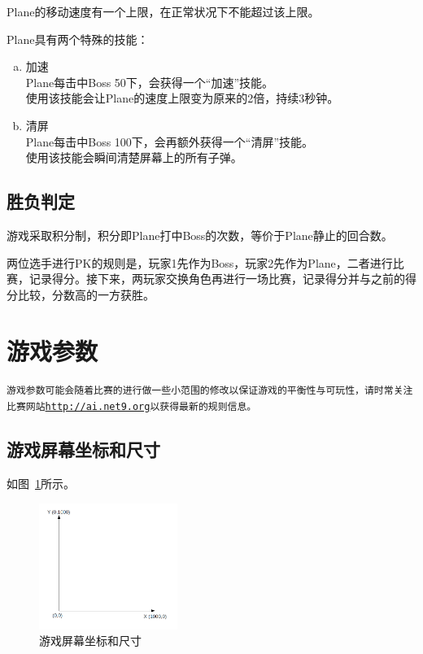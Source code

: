 \documentclass[11pt,a4paper]{article}
\begin{document}
Plane的移动速度有一个上限，在正常状况下不能超过该上限。

Plane具有两个特殊的技能：
\begin{enumerate}[(a)]
\item 加速\\
Plane每击中Boss 50下，会获得一个``加速''技能。\\
使用该技能会让Plane的速度上限变为原来的2倍，持续3秒钟。
\item 清屏\\
Plane每击中Boss 100下，会再额外获得一个``清屏''技能。\\
使用该技能会瞬间清楚屏幕上的所有子弹。
\end{enumerate}

\subsection{胜负判定}
游戏采取积分制，积分即Plane打中Boss的次数，等价于Plane静止的回合数。

两位选手进行PK的规则是，玩家1先作为Boss，玩家2先作为Plane，二者进行比赛，记录得分。接下来，两玩家交换角色再进行一场比赛，记录得分并与之前的得分比较，分数高的一方获胜。

\section{游戏参数}

\texttt{游戏参数可能会随着比赛的进行做一些小范围的修改以保证游戏的平衡性与可玩性，请时常关注比赛网站\url{http://ai.net9.org}以获得最新的规则信息。}

\subsection{游戏屏幕坐标和尺寸}
如图~\ref{fig:coor}所示。
\begin{figure}
\centering
\includegraphics[width=0.4\textwidth]{coor.png}
\caption{游戏屏幕坐标和尺寸}
\label{fig:coor}
\end{figure}
\end{document}
